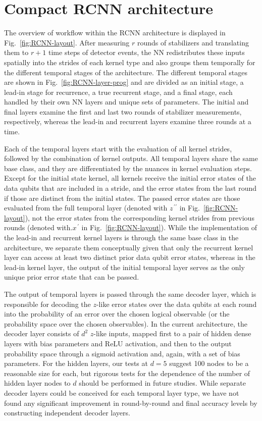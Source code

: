\section{Compact RCNN architecture}
\label{sec:rcnn}

The overview of workflow within the RCNN architecture is displayed in Fig.~\ref{fig:RCNN-layout}. After measuring $r$ rounds of stabilizers and translating them to $r+1$ time steps of detector events, the NN redistributes these inputs spatially into the strides of each kernel type and also groups them temporally for the different temporal stages of the architecture. The different temporal stages are shown in Fig.~\ref{fig:RCNN-layer-prog} and are divided as an initial stage, a lead-in stage for recurrence, a true recurrent stage, and a final stage, each handled by their own NN layers and unique sets of parameters. The initial and final layers examine the first and last two rounds of stabilizer measurements, respectively, whereas the lead-in and recurrent layers examine three rounds at a time.

Each of the temporal layers start with the evaluation of all kernel strides, followed by the combination of kernel outputs. All temporal layers share the same base class, and they are differentiated by the nuances in kernel evaluation steps. Except for the initial state kernel, all kernels receive the initial error states of the data qubits that are included in a stride, and the error states from the last round if those are distinct from the initial states. The passed error states are those evaluated from the full temporal layer (denoted with $z^{\,\prime\prime}$ in Fig.~\ref{fig:RCNN-layout}), not the error states from the corresponding kernel strides from previous rounds (denoted with.$x^{\,\prime}$ in Fig.~\ref{fig:RCNN-layout}). While the implementation of the lead-in and recurrent kernel layers is through the same base class in the architecture, we separate them conceptually given that only the recurrent kernel layer can access at least two distinct prior data qubit error states, whereas in the lead-in kernel layer, the output of the initial temporal layer serves as the only unique prior error state that can be passed.

The output of temporal layers is passed through the same decoder layer, which is responsible for decoding the $z$-like error states over the data qubits at each round into the probability of an error over the chosen logical observable (or the probability space over the chosen observables). In the current architecture, the decoder layer consists of $d^2$ $z$-like inputs, mapped first to a pair of hidden dense layers with bias parameters and ReLU activation, and then to the output probability space through a sigmoid activation and, again, with a set of bias parameters. For the hidden layers, our tests at $d=5$ suggest 100 nodes to be a reasonable size for each, but rigorous tests for the dependence of the number of hidden layer nodes to $d$ should be performed in future studies. While separate decoder layers could be conceived for each temporal layer type, we have not found any significant improvement in round-by-round and final accuracy levels by constructing independent decoder layers.

